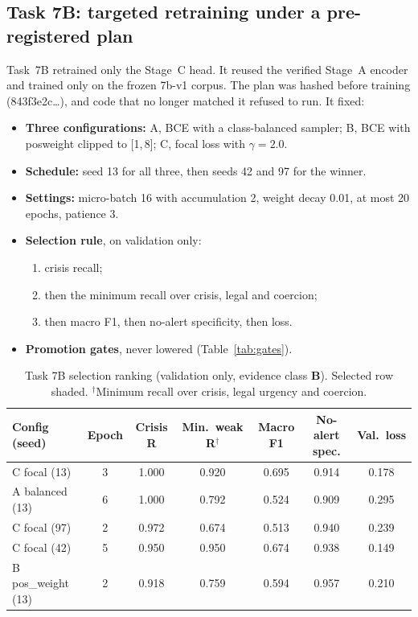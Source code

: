 \documentclass[11pt,a4paper]{article}
\newcommand{\codeus}{\textunderscore\allowbreak}
\DeclareRobustCommand{\code}[1]{{\ttfamily\let\_\codeus #1}}
\newcommand{\evB}{\textsf{\textbf{B}}}
\begin{document}
\subsection{Task 7B: targeted retraining under a pre-registered plan}
Task~7B retrained only the Stage~C head. It reused the verified Stage~A encoder and trained only on
the frozen \code{7b-v1} corpus. The plan was hashed before training
(\code{843f3e2c\ldots}), and code that no longer matched it refused to run. It fixed:
\begin{itemize}
  \item \textbf{Three configurations:} A, BCE with a class-balanced sampler; B, BCE with
        \code{pos\_weight} clipped to [1,\,8]; C, focal loss with $\gamma = 2.0$.
  \item \textbf{Schedule:} seed 13 for all three, then seeds 42 and 97 for the winner.
  \item \textbf{Settings:} micro-batch 16 with accumulation 2, weight decay 0.01, at most 20 epochs,
        patience 3.
  \item \textbf{Selection rule}, on validation only:
        \begin{enumerate}
          \item crisis recall;
          \item then the minimum recall over crisis, legal and coercion;
          \item then macro F1, then no-alert specificity, then loss.
        \end{enumerate}
  \item \textbf{Promotion gates}, never lowered (Table~\ref{tab:gates}).
\end{itemize}

\begin{table}[!htbp]
\centering\small
\caption{Task 7B selection ranking (validation only, evidence class \evB). Selected row shaded.
$^{\dagger}$Minimum recall over crisis, legal urgency and coercion.}
\label{tab:7bsel}
\begin{tabular}{@{}lcccccc@{}}
\toprule
Config (seed) & Epoch & Crisis R & Min.\ weak R$^{\dagger}$ & Macro F1 & No-alert spec. & Val.\ loss \\
\midrule
\rowcolor{selrow} C focal (13) & 3 & 1.000 & 0.920 & 0.695 & 0.914 & 0.178 \\
A balanced (13) & 6 & 1.000 & 0.792 & 0.524 & 0.909 & 0.295 \\
C focal (97) & 2 & 0.972 & 0.674 & 0.513 & 0.940 & 0.239 \\
C focal (42) & 5 & 0.950 & 0.950 & 0.674 & 0.938 & 0.149 \\
B pos\_weight (13) & 2 & 0.918 & 0.759 & 0.594 & 0.957 & 0.210 \\
\bottomrule
\end{tabular}
\end{table}
\end{document}
